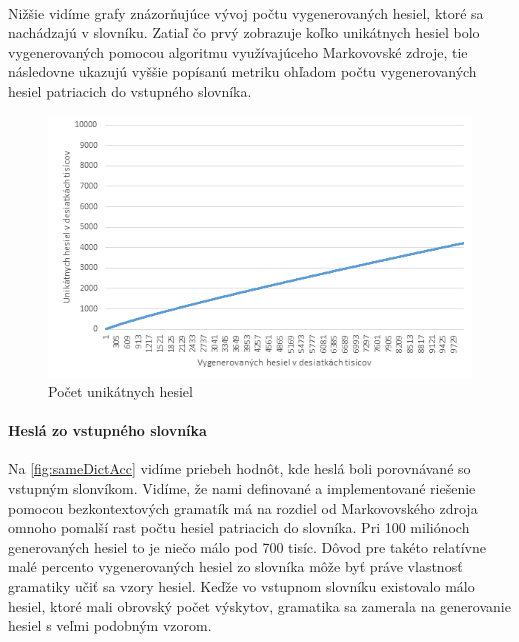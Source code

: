 \paragraph{}
Nižšie vidíme grafy znázorňujúce vývoj počtu vygenerovaných hesiel, ktoré sa nachádzajú v slovníku. Zatiaľ čo prvý zobrazuje koľko unikátnych hesiel bolo vygenerovaných pomocou algoritmu využívajúceho Markovovské zdroje, tie následovne ukazujú vyššie popísanú metriku ohľadom počtu vygenerovaných hesiel patriacich do vstupného slovníka.

\begin{figure}[ht]
    \centering
    \includegraphics[width=1\textwidth]{uniqMarkov}
    \caption{Počet unikátnych hesiel}
    \label{fig:uniqMarkov}
\end{figure}
\paragraph{Heslá zo vstupného slovníka}
Na \ref{fig:sameDictAcc} vidíme priebeh hodnôt, kde heslá boli porovnávané so vstupným slonvíkom. Vidíme, že nami definované a implementované riešenie pomocou bezkontextových gramatík má na rozdiel od Markovovského zdroja omnoho pomalší rast počtu hesiel patriacich do slovníka. Pri 100 miliónoch generovaných hesiel to je niečo málo pod 700 tisíc. Dôvod pre takéto relatívne malé percento vygenerovaných hesiel zo slovníka môže byť práve vlastnosť gramatiky učiť sa vzory hesiel. Keďže vo vstupnom slovníku existovalo málo hesiel, ktoré mali obrovský počet výskytov, gramatika sa zamerala na generovanie hesiel s veľmi podobným vzorom.

